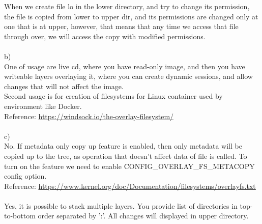 \documentclass[a4paper]{article}
\begin{document}
When we create file lo in the lower directory, and try to change  its permission, the file is copied from lower to upper dir, and its permissions are changed only at one that is at upper, however, that means that any time we access that file through over, we will access the copy with modified permissions.\\
\\
b)\\
One of usage are live cd, where you have read-only image, and then you have writeable layers overlaying it, where you can create dynamic sessions, and allow changes that will not affect the image.\\
Second usage is for creation of filesystems for Linux container used by environment like Docker. \\
Reference: \url{https://windsock.io/the-overlay-filesystem/}
\\\\
c)\\
No. If metadata only copy up feature is enabled, then only metadata will be copied up to the tree, as operation that doesn't affect data of file is called. To turn on the feature we need to enable CONFIG\_OVERLAY\_FS\_METACOPY config option.\\
Reference: \url{https://www.kernel.org/doc/Documentation/filesystems/overlayfs.txt}\\
\\
Yes, it is possible to stack multiple layers. You provide list of directories in top-to-bottom order separated by ':'. All changes will displayed in upper directory. \\
\end{document}
